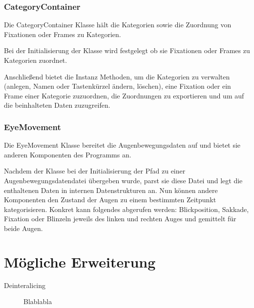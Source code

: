 \documentclass[a4paper,draft]{scrartcl}
\begin{document}
\subsubsection{CategoryContainer}
Die CategoryContainer Klasse hält die Kategorien sowie die Zuordnung von Fixationen oder Frames zu Kategorien.

Bei der Initialisierung der Klasse wird festgelegt ob sie Fixationen oder Frames zu Kategorien zuordnet.

Anschließend bietet die Instanz Methoden, um die Kategorien zu verwalten (anlegen, Namen oder Tastenkürzel ändern, löschen), eine Fixation oder ein Frame einer Kategorie zuzuordnen, die Zuordnungen zu exportieren und um auf die beinhalteten Daten zuzugreifen.

\subsubsection{EyeMovement}
Die EyeMovement Klasse bereitet die Augenbewegungsdaten auf und bietet sie anderen Komponenten des Programms an.

Nachdem der Klasse bei der Initialisierung der Pfad zu einer Augenbewegungsdatendatei übergeben wurde, parst sie diese Datei und legt die enthaltenen Daten in internen Datenstrukturen an. Nun können andere Komponenten den Zustand der Augen zu einem bestimmten Zeitpunkt kategorisieren. Konkret kann folgendes abgerufen werden: Blickposition, Sakkade, Fixation oder Blinzeln jeweils des linken und rechten Auges und gemittelt für beide Augen.

\section{M\"ogliche Erweiterung}
  \begin{description}
    \item[Deinteralicing] Blablabla
  \end{description}
\end{document}
